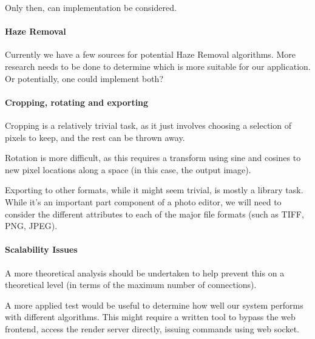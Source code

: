 \documentclass[14pt]{article}
\begin{document}
    Only then, can implementation be considered.

  \paragraph{Haze Removal}
    Currently we have a few sources for potential Haze Removal algorithms. More research needs to be done
    to determine which is more suitable for our application. Or potentially, one could implement both?

  \paragraph{Cropping, rotating and exporting}
    Cropping is a relatively trivial task, as it just involves choosing a selection of pixels to keep,
    and the rest can be thrown away.

    Rotation is more difficult, as this requires a transform using sine and cosines to new pixel locations
    along a space (in this case, the output image).

    Exporting to other formats, while it might seem trivial, is mostly a library task. While it's an important part component
    of a photo editor, we will need to consider the different attributes to each of the major file formats (such as TIFF, PNG, JPEG).

  \paragraph{Scalability Issues}
    A more theoretical analysis should be undertaken to help prevent this on a theoretical level (in terms of the maximum number of connections).

    A more applied test would be useful to determine how well our system performs with different algorithms. This might require a written tool to
    bypass the web frontend, access the render server directly, issuing commands using web socket.
\end{document}
